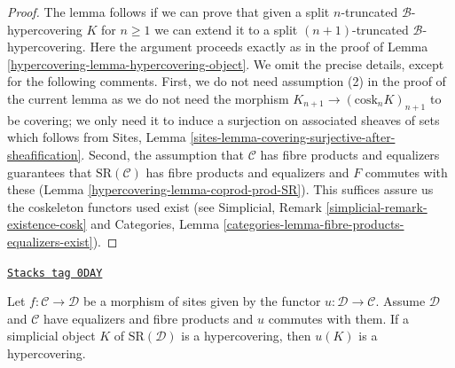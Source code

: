 \begin{proof}
\medskip\noindent
The lemma follows if we can prove that given a split
$n$-truncated $\mathcal{B}$-hypercovering $K$ for $n \geq 1$
we can extend it to a split $(n + 1)$-truncated $\mathcal{B}$-hypercovering.
Here the argument proceeds exactly as in the proof of
Lemma \ref{hypercovering-lemma-hypercovering-object}.
We omit the precise details, except for the following comments.
First, we do not need assumption (2) in the proof of the current
lemma as we do not need the morphism
$K_{n + 1} \to (\text{cosk}_n K)_{n + 1}$ to be covering;
we only need it to induce a surjection on associated sheaves of sets
which follows from
Sites, Lemma \ref{sites-lemma-covering-surjective-after-sheafification}.
Second, the assumption that $\mathcal{C}$ has fibre products and equalizers
guarantees that $\text{SR}(\mathcal{C})$ has fibre products
and equalizers and $F$ commutes with these
(Lemma \ref{hypercovering-lemma-coprod-prod-SR}). This suffices
assure us the coskeleton functors used exist (see
Simplicial, Remark \ref{simplicial-remark-existence-cosk} and
Categories, Lemma \ref{categories-lemma-fibre-products-equalizers-exist}).
\end{proof}

\begin{lemma}
\label{hypercovering-lemma-hypercovering-morphism-sites}
\href{https://stacks.math.columbia.edu/tag/0DAY}{\texttt{Stacks tag 0DAY}}

Let $f : \mathcal{C} \to \mathcal{D}$ be a morphism of sites
given by the functor $u : \mathcal{D} \to \mathcal{C}$.
Assume $\mathcal{D}$ and $\mathcal{C}$ have equalizers and
fibre products and $u$ commutes with them.
If a simplicial object $K$ of $\text{SR}(\mathcal{D})$
is a hypercovering, then $u(K)$ is a hypercovering.
\end{lemma}

